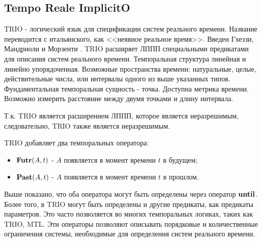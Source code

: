 		\subsection{Tempo Reale ImplicitO}
		TRIO - логический язык для спецификации систем реального времени. 
		Название переводится с итальянского, как <<неявное реальное время>>.
		Введен Гхеззи, Мандриоли и Морзенти \cite{TRIO}.
		TRIO расширяет ЛППП специальными предикатами для описания систем реального времени.
		Темпоральная структура линейная и линейно упорядоченная. 
		Возможные пространства времени: натуральные, целые, действительные числа, или интервалы одного из выше указанных типов.
		Фундаментальная темпоральная сущность - точка. 
		Доступна метрика времени.
		Возможно измерить расстояние между двумя точками и длину интервала.
		
		Т.к. TRIO является расширением ЛППП, которое является неразрешимым, следовательно, TRIO также является неразрешимым.
		
		TRIO добавляет два темпоральных оператора:
		\begin{itemize}
			\item $ \text{\textbf{Futr}}(A,t) $ - $ A $ появляется в момент времени $ t $ в будущем;
			\item $ \text{\textbf{Past}}(A,t) $ - $ A $ появляется в момент времени $ t $ в прошлом.
		\end{itemize}
		Выше показано, что оба оператора могут быть определены через оператор $ \text{\textbf{until}} $.
		Более того, в TRIO могут быть определены и другие предикаты, как предикаты параметров.
		Это часто позволяется во многих темпоральных логиках, таких как TRIO, MTL.
		Эти операторы позволяют описывать порядковые и количественные ограничения системы, необходимые для определения систем реального времени.
		
